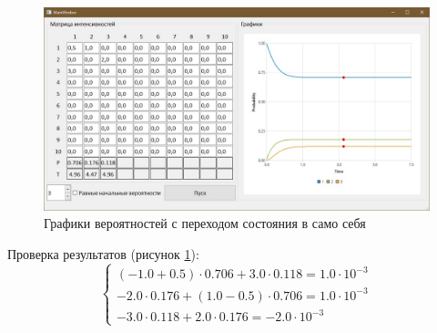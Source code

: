 \newpage
\begin{figure}[h]
	\includegraphics[width=1\linewidth]{inc/img/g4}
	\caption{Графики вероятностей с переходом состояния в само себя}
	\label{g4}
\end{figure}

Проверка результатов (рисунок \ref{g4}):
\begin{equation}
	\left\{\begin{array}{l}
		(-1.0+0.5) \cdot 0.706 + 3.0 \cdot 0.118 = 1.0 \cdot 10^{-3} \\
		-2.0 \cdot 0.176 + (1.0-0.5) \cdot 0.706 = 1.0 \cdot 10^{-3} \\
		-3.0 \cdot 0.118 + 2.0 \cdot 0.176 = -2.0 \cdot 10^{-3}
	\end{array}\right.
	\label{eq1}
\end{equation}